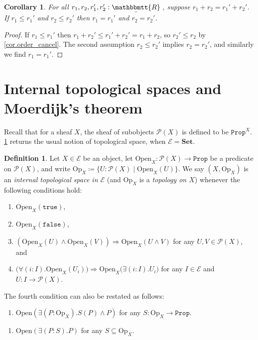 \documentclass[11pt, oneside, article]{memoir}
\theoremstyle{plain}
\newtheorem{corollary}[theorem]{Corollary}
\theoremstyle{definition}
\newtheorem{definition}[theorem]{Definition}
\theoremstyle{remark}
\renewcommand{\ss}{\subseteq}
\newcommand{\const}[1]{\mathtt{#1}}
\newcommand{\Set}[1]{\mathrm{#1}}
\newcommand{\cat}[1]{\mathcal{#1}}
\newcommand{\Cat}[1]{\mathbf{#1}}
\newcommand{\smset}{\Cat{Set}}
\newcommand{\ubar}[1]{\underaccent{\bar}{#1}}
\newcommand{\internal}[1]{\raisebox{-.03ex}{$\mathbbmtt{#1}$}}
\newcommand{\hs}{\hspace{1.1pt}}
\newcommand{\trr}{\internal{R}\hs}
\newcommand{\tlrr}{\ubar{\trr}\hs}
\newcommand{\pow}{\mathcal{P}}
\newcommand{\prop}{\const{Prop}}
\newcommand{\Op}{\Set{Op}}
\newcommand{\Open}{\Set{Open}}
\newcommand{\imp}{\Rightarrow}
\newcommand{\true}{\const{true}}
\newcommand{\false}{\const{false}}
\begin{document}
\begin{corollary}\label{cor.favorite}
For all $r_1,r_2,r_1',r_2':\tlrr$, suppose $r_1+r_2=r_1'+r_2'$. If $r_1\leq r_1'$ and $r_2\leq r_2'$ then $r_1=r_1'$ and $r_2=r_2'$.
\end{corollary}
\begin{proof}
If $r_1\leq r_1'$ then $r_1+r_2'\leq r_1'+r_2'=r_1+r_2$, so $r_2'\leq r_2$ by \cref{cor.order_cancel}. The second assumption $r_2\leq r_2'$ implies $r_2=r_2'$, and similarly we find $r_1=r_1'$.
\end{proof}

\section{Internal topological spaces and Moerdijk's theorem}


Recall that for a sheaf $X$, the sheaf of subobjects $\pow(X)$ is defined to be $\prop^X$. \cref{def.internal_space} returns the usual notion of topological space, when $\cat{E}=\smset$.

\begin{definition}\label{def.internal_space}
Let $X\in\cat{E}$ be an object, let $\Open_X\colon\pow(X)\to\prop$ be a predicate on $\pow(X)$, and write $\Op_X\coloneq\{U:\pow(X)\mid\Open_X(U)\}$. We say $(X,\Op_X)$ is an \emph{internal topological space in $\cat{E}$} (and $\Op_X$ is a \emph{topology on $X$}) whenever the following conditions hold:
\begin{enumerate}
	\item $\Open_X(\true)$,
	\item $\Open_X(\false)$,
	\item $(\Open_X(U)\wedge\Open_X(V))\imp \Open_X(U\wedge V)$ for any $U,V\in\pow(X)$, and
	\item $\big(\forall(i:I).\Open_X(U_i)\big)\imp\Open_X\big(\exists(i:I).U_i\big)$ for any $I\in\cat{E}$ and $U\colon I\to\pow(X)$.
\end{enumerate}
The fourth condition can also be restated as follows:
\begin{enumerate}[label=4'.]
	\item $\Open(\exists(P:\Op_X).S(P)\wedge P)$ for any $S\colon\Op_X\to\prop$. 
\end{enumerate}
\begin{enumerate}[label=4''.]
	\item $\Open(\exists(P:S).P)$ for any $S\ss\Op_X$.
\end{enumerate}
\end{definition}
\end{document}
